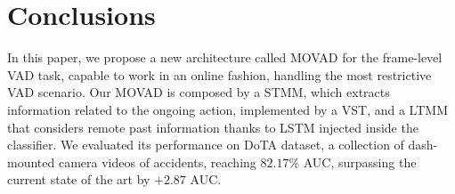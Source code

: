 \section{Conclusions}
\label{sec:conclusions}

In this paper, we propose a new architecture called MOVAD for the frame-level VAD task, capable to work in an online fashion, handling the most restrictive VAD scenario. 
Our MOVAD is composed by a STMM, which extracts information related to the ongoing action, implemented by a VST, and a LTMM that considers remote past information thanks to LSTM injected inside the classifier.
We evaluated its performance on DoTA dataset, a collection of dash-mounted camera videos of accidents, reaching $82.17\%$ AUC, surpassing the current state of the art by +$2.87$ AUC.